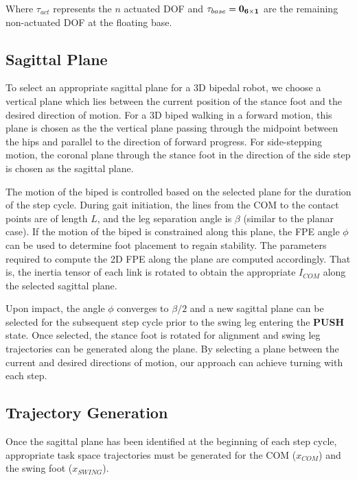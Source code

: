 Where $\tau_{act}$ represents the $n$ actuated DOF and $\tau_{base} = \bf{0}_{6 \times 1} $ are the remaining non-actuated DOF at the floating base.

\subsection{Sagittal Plane} %
\label{sub:sagittal_plane}
To select an appropriate sagittal plane for a 3D bipedal robot, we choose a vertical plane which lies between the current position of the stance foot and the desired direction of motion. For a 3D biped walking in a forward motion, this plane is chosen as the the vertical plane passing through the midpoint between the hips and parallel to the direction of forward progress. For side-stepping motion, the coronal plane through the stance foot in the direction of the side step is chosen as the sagittal plane.

The motion of the biped is controlled based on the selected plane for the duration of the step cycle. During gait initiation, the lines from the COM to the contact points are of length $L$, and the leg separation angle is $\beta$ (similar to the planar case). If the motion of the biped is constrained along this plane, the FPE angle $\phi$ can be used to determine foot placement to regain stability. The parameters required to compute the 2D FPE along the plane are computed accordingly. That is, the inertia tensor of each link is rotated to obtain the appropriate $I_{COM}$ along the selected sagittal plane.

Upon impact, the angle $\phi$ converges to $\beta/2$ and a new sagittal plane can be selected for the subsequent step cycle prior to the swing leg entering the \textbf{PUSH} state. Once selected, the stance foot is rotated for alignment and swing leg trajectories can be generated along the plane. By selecting a plane between the current and desired directions of motion, our approach can achieve turning with each step.


\subsection{Trajectory Generation} %
\label{sub:trajectory_generation}
Once the sagittal plane has been identified at the beginning of each step cycle, appropriate task space trajectories must be generated for the COM ($x_{COM}$) and the swing foot ($x_{SWING}$).

